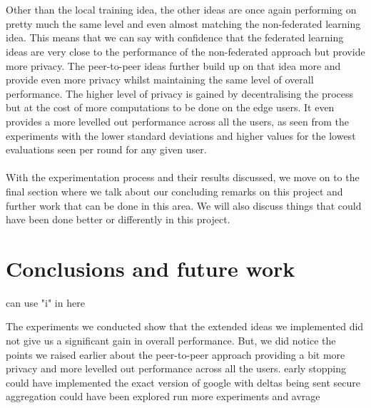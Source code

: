 \documentclass[12pt]{article}
\begin{document}
\\\\
Other than the local training idea, the other ideas are once again performing on pretty much the same level and even almost matching the non-federated learning idea. This means that we can say with confidence that the federated learning ideas are very close to the performance of the non-federated approach but provide more privacy. The peer-to-peer ideas further build up on that idea more and provide even more privacy whilst maintaining the same level of overall performance. The higher level of privacy is gained by decentralising the process but at the cost of more computations to be done on the edge users. It even provides a more levelled out performance across all the users, as seen from the experiments with the lower standard deviations and higher values for the lowest evaluations seen per round for any given user.
\\\\
With the experimentation process and their results discussed, we move on to the final section where we talk about our concluding remarks on this project and further work that can be done in this area. We will also discuss things that could have been done better or differently in this project. 
\clearpage
\section{Conclusions and future work}
can use "i" in here


The experiments we conducted show that the extended ideas we implemented did not give us a significant gain in overall performance. But, we did notice the points we raised earlier about the peer-to-peer approach providing a bit more privacy and more levelled out performance across all the users. 
early stopping
could have implemented the exact version of google with deltas being sent
secure aggregation could have been explored
run more experiments and avrage
\clearpage
\printbibliography[title={Bibliography}]
\end{document}
